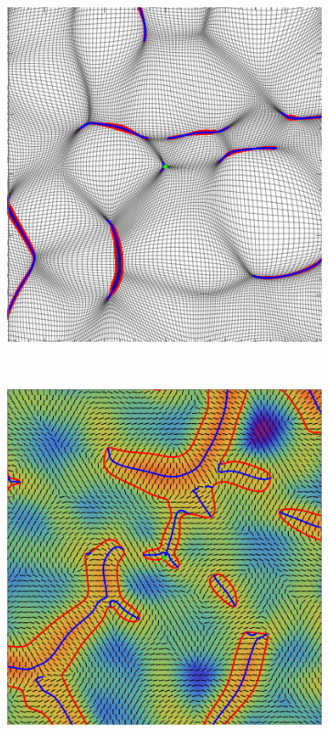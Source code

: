 \documentclass[a4paper, 11pt]{article}
\begin{document}
\begin{figure}
\begin{subfigure}[b]{0.28\textwidth}
\end{subfigure}~
\begin{subfigure}[b]{0.28\textwidth}
\includegraphics[width=\textwidth]{Elliptic_Nb}
\end{subfigure}\\ \vspace{0.2\baselineskip}
\begin{subfigure}[b]{0.28\textwidth}
\includegraphics[width=\textwidth]{Hyperbolic_L}

\end{subfigure}
\end{figure}
\end{document}
